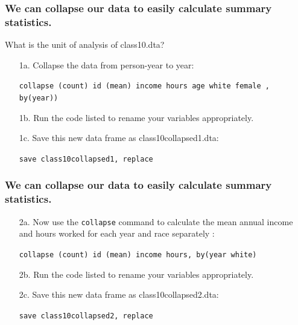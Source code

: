 \documentclass[11pt]{beamer}
\begin{document}
\begin{frame}
\frametitle{We can collapse our data to easily calculate summary statistics.}
What is the unit of analysis of class10.dta? \\ \bigskip \pause
\begin{itemize}
	\item[1a.] Collapse the data from person-year to year: 
	\item[   ] \texttt{collapse (count) id  (mean) income hours age white female , by(year))} \pause \bigskip
	\item[1b.] Run the code listed to rename your variables appropriately. \pause \bigskip
	\item[1c.] Save this new data frame as class10collapsed1.dta: \pause
	\item[   ] \texttt{save class10collapsed1, replace}  
\end{itemize}
\end{frame}


\begin{frame}
\frametitle{We can collapse our data to easily calculate summary statistics.}
\begin{itemize}
	\item[2a.] Now use the \texttt{collapse} command to calculate the mean annual income and hours worked for each year and race separately  : 
	\item[   ] \texttt{collapse (count) id  (mean) income hours, by(year white)} \pause \bigskip
	\item[2b.] Run the code listed to rename your variables appropriately. 
	\item[2c.] Save this new data frame as class10collapsed2.dta: 
	\item[   ] \texttt{save class10collapsed2, replace} 
\end{itemize}
\end{frame}
\end{document}
